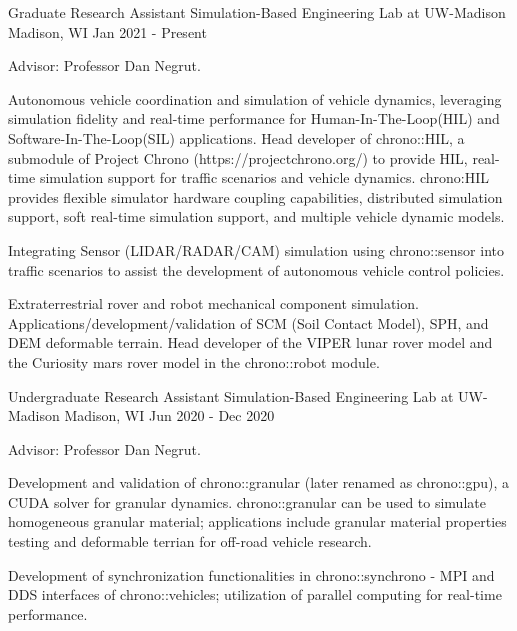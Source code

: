 

\begin{cventries}
	
  \cventry
	{Graduate Research Assistant} %
	{Simulation-Based Engineering Lab at UW-Madison} %
	{Madison, WI} %
	{Jan 2021 - Present} %
	{
		\begin{cvitems} %
			\item {Advisor: Professor Dan Negrut.}
			\item {Autonomous vehicle coordination and simulation of vehicle dynamics, leveraging simulation fidelity and real-time performance for Human-In-The-Loop(HIL) and Software-In-The-Loop(SIL) applications. Head developer of chrono::HIL, a submodule of Project Chrono (https://projectchrono.org/) to provide HIL, real-time simulation support for traffic scenarios and vehicle dynamics. chrono:HIL provides flexible simulator hardware coupling capabilities, distributed simulation support, soft real-time simulation support, and multiple vehicle dynamic models.}
			\item {Integrating Sensor (LIDAR/RADAR/CAM) simulation using chrono::sensor into traffic scenarios to assist the development of autonomous vehicle control policies.}
			\item {Extraterrestrial rover and robot mechanical component simulation. Applications/development/validation of SCM (Soil Contact Model), SPH, and DEM deformable terrain. Head developer of the VIPER lunar rover model and the Curiosity mars rover model in the chrono::robot module.}
		\end{cvitems}
	}
		
	

  \cventry
	{Undergraduate Research Assistant} %
	{Simulation-Based Engineering Lab at UW-Madison} %
	{Madison, WI} %
	{Jun 2020 - Dec 2020} %
	{
		\begin{cvitems} %
			\item {Advisor: Professor Dan Negrut.}
			\item {Development and validation of chrono::granular (later renamed as chrono::gpu), a CUDA solver for granular dynamics. chrono::granular can be used to simulate homogeneous granular material; applications include granular material properties testing and deformable terrian for off-road vehicle research.}
			\item {Development of synchronization functionalities in chrono::synchrono - MPI and DDS interfaces of chrono::vehicles; utilization of parallel computing for real-time performance.}
		\end{cvitems}
	}



\end{cventries}
